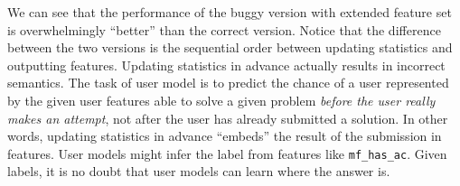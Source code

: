     We can see that the performance of the buggy version with extended feature set
    is overwhelmingly ``better'' than the correct version.
    Notice that the difference between the two versions is the sequential order between
    updating statistics and outputting features.
    Updating statistics in advance actually results in incorrect semantics.
    The task of user model is to predict the chance of a user represented by the given user features
    able to solve a given problem \emph{before the user really makes an attempt},
    not after the user has already submitted a solution.
    In other words, updating statistics in advance ``embeds'' the result of the submission in features.
    User models might infer the label from features like \verb|mf_has_ac|.
    Given labels, it is no doubt that user models can learn where the answer is.











